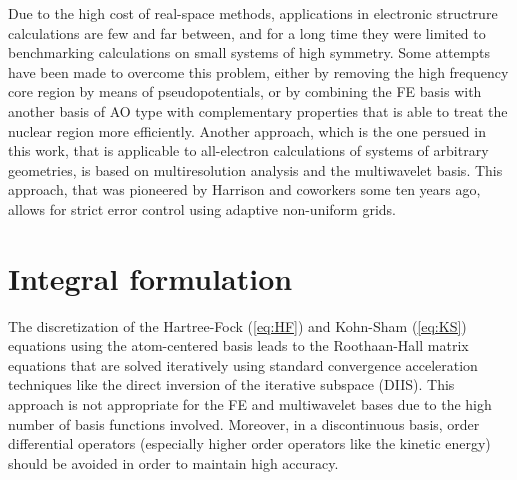 Due to the high cost of real-space methods, applications in electronic structrure calculations are few
and far between, and for a long time they were limited to benchmarking calculations on small systems 
of high symmetry\cite{Laakonen}. Some attempts have been made to overcome this problem, either by 
removing the high frequency core region by means of pseudopotentials, or by combining the FE basis 
with another basis of AO type with complementary properties that is able to treat the nuclear region 
more efficiently\cite{Watson,Sundholm}. Another approach, which is the one persued in this work,
that is applicable to all-electron calculations of systems of arbitrary geometries, is based on 
multiresolution analysis and the multiwavelet basis. This approach, that was pioneered by Harrison and 
coworkers\cite{Harrison:2004} some ten years ago, allows for strict error control using adaptive 
non-uniform grids. 

\section{Integral formulation}
The discretization of the Hartree-Fock (\ref{eq:HF}) and Kohn-Sham (\ref{eq:KS})
equations using the atom-centered basis leads to the Roothaan-Hall\cite{roothaan,hall} matrix 
equations that are solved iteratively using standard convergence acceleration techniques like
the direct inversion of the iterative subspace (DIIS)\cite{diis}. This approach is not appropriate
for the FE and multiwavelet bases due to the high number of basis functions involved. Moreover,
in a discontinuous basis, order differential operators (especially higher order operators like
the kinetic energy) should be avoided in order to maintain high accuracy\cite{Harrison:2004}.

